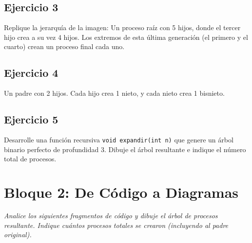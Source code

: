 \documentclass[12pt,a4paper]{article}
\begin{document}
\newpage

\subsection*{Ejercicio 3}
Replique la jerarquía de la imagen: Un proceso raíz con 5 hijos, donde el tercer hijo crea a su vez 4 hijos. Los extremos de esta última generación (el primero y el cuarto) crean un proceso final cada uno.
\begin{center}
\end{center}

\subsection*{Ejercicio 4}
Un padre con 2 hijos. Cada hijo crea 1 nieto, y cada nieto crea 1 bisnieto.
\begin{center}
\end{center}

\subsection*{Ejercicio 5}
Desarrolle una función recursiva \texttt{void expandir(int n)} que genere un árbol binario perfecto de profundidad 3. Dibuje el árbol resultante e indique el número total de procesos.

\newpage

\section*{Bloque 2: De Código a Diagramas}
\textit{Analice los siguientes fragmentos de código y dibuje el árbol de procesos resultante. Indique cuántos procesos totales se crearon (incluyendo al padre original).}
\end{document}
